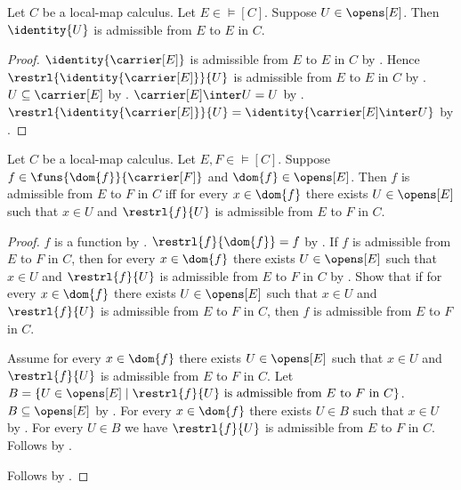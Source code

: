 \begin{theorem}\label{admissible_open_identity}
    Let $C$ be a local-map calculus.
    Let $E\in\models[C]$.
    Suppose $U\in\opens[E]$.
    Then $\identity{U}$ is admissible from $E$ to $E$ in $C$.
\end{theorem}
\begin{proof}
    $\identity{\carrier[E]}$ is admissible from $E$ to $E$ in $C$ by
        .
    Hence $\restrl{\identity{\carrier[E]}}{U}$ is admissible from $E$ to $E$ in $C$
        by .
    $U\subseteq\carrier[E]$ by .
    $\carrier[E]\inter U=U$ by .
    $\restrl{\identity{\carrier[E]}}{U}=\identity{\carrier[E]\inter U}$ by
        .
\end{proof}

\begin{theorem}\label{admissible_map_iff_locally}
    Let $C$ be a local-map calculus.
    Let $E,F\in\models[C]$.
    Suppose $f\in\funs{\dom{f}}{\carrier[F]}$ and $\dom{f}\in\opens[E]$.
    Then $f$ is admissible from $E$ to $F$ in $C$ iff
        for every $x\in\dom{f}$ there exists $U\in\opens[E]$ such that
            $x\in U$ and $\restrl{f}{U}$ is admissible from $E$ to $F$ in $C$.
\end{theorem}
\begin{proof}
    $f$ is a function by .
    $\restrl{f}{\dom{f}}=f$ by .
    If $f$ is admissible from $E$ to $F$ in $C$, then
        for every $x\in\dom{f}$ there exists $U\in\opens[E]$ such that
            $x\in U$ and $\restrl{f}{U}$ is admissible from $E$ to $F$ in $C$
        by \auto.
    Show that if for every $x\in\dom{f}$ there exists $U\in\opens[E]$ such that
        $x\in U$ and $\restrl{f}{U}$ is admissible from $E$ to $F$ in $C$,
        then $f$ is admissible from $E$ to $F$ in $C$.
    \begin{subproof}
        Assume for every $x\in\dom{f}$ there exists $U\in\opens[E]$ such that
            $x\in U$ and $\restrl{f}{U}$ is admissible from $E$ to $F$ in $C$.
        Let $B=\{U\in\opens[E]\mid
            \text{$\restrl{f}{U}$ is admissible from $E$ to $F$ in $C$}\}$.
        $B\subseteq\opens[E]$ by .
        For every $x\in\dom{f}$ there exists $U\in B$ such that $x\in U$ by \auto.
        For every $U\in B$ we have
            $\restrl{f}{U}$ is admissible from $E$ to $F$ in $C$.
        Follows by .
    \end{subproof}
    Follows by \auto.
\end{proof}

